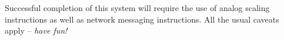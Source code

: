\vskip 10pt

Successful completion of this system will require the use of analog scaling instructions as well as network messaging instructions.  All the usual caveats apply -- {\it have fun!}

\vfil 

\eject






 











